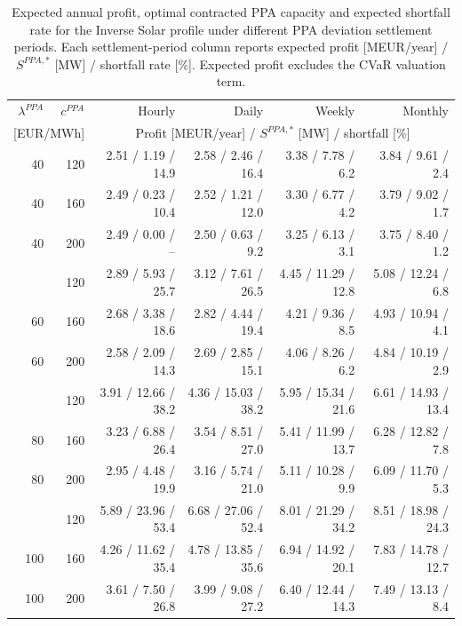 \begin{table}[htbp]
\centering
\scriptsize
\setlength{\tabcolsep}{2.5pt}
\caption{Expected annual profit, optimal contracted PPA capacity and expected shortfall rate for the Inverse Solar profile under different PPA deviation settlement periods. Each settlement-period column reports expected profit [MEUR/year] / $S^{PPA,*}$ [MW] / shortfall rate [\%]. Expected profit excludes the CVaR valuation term.}
\label{tab:settlement_period_inverse_solar}
\begin{tabular*}{\textwidth}{@{\extracolsep{\fill}}rrrrrr@{}}
\toprule
$\lambda^{PPA}$ & $c^{PPA}$ & Hourly & Daily & Weekly & Monthly \\
\multicolumn{2}{c}{[EUR/MWh]} & \multicolumn{4}{c}{Profit [MEUR/year] / $S^{PPA,*}$ [MW] / shortfall [\%]} \\
\midrule
40 & 120 & 2.51 / 1.19 / 14.9 & 2.58 / 2.46 / 16.4 & 3.38 / 7.78 / 6.2 & 3.84 / 9.61 / 2.4 \\
40 & 160 & 2.49 / 0.23 / 10.4 & 2.52 / 1.21 / 12.0 & 3.30 / 6.77 / 4.2 & 3.79 / 9.02 / 1.7 \\
40 & 200 & 2.49 / 0.00 / -- & 2.50 / 0.63 / 9.2 & 3.25 / 6.13 / 3.1 & 3.75 / 8.40 / 1.2 \\
\addlinespace
60 & 120 & 2.89 / 5.93 / 25.7 & 3.12 / 7.61 / 26.5 & 4.45 / 11.29 / 12.8 & 5.08 / 12.24 / 6.8 \\
60 & 160 & 2.68 / 3.38 / 18.6 & 2.82 / 4.44 / 19.4 & 4.21 / 9.36 / 8.5 & 4.93 / 10.94 / 4.1 \\
60 & 200 & 2.58 / 2.09 / 14.3 & 2.69 / 2.85 / 15.1 & 4.06 / 8.26 / 6.2 & 4.84 / 10.19 / 2.9 \\
\addlinespace
80 & 120 & 3.91 / 12.66 / 38.2 & 4.36 / 15.03 / 38.2 & 5.95 / 15.34 / 21.6 & 6.61 / 14.93 / 13.4 \\
80 & 160 & 3.23 / 6.88 / 26.4 & 3.54 / 8.51 / 27.0 & 5.41 / 11.99 / 13.7 & 6.28 / 12.82 / 7.8 \\
80 & 200 & 2.95 / 4.48 / 19.9 & 3.16 / 5.74 / 21.0 & 5.11 / 10.28 / 9.9 & 6.09 / 11.70 / 5.3 \\
\addlinespace
100 & 120 & 5.89 / 23.96 / 53.4 & 6.68 / 27.06 / 52.4 & 8.01 / 21.29 / 34.2 & 8.51 / 18.98 / 24.3 \\
100 & 160 & 4.26 / 11.62 / 35.4 & 4.78 / 13.85 / 35.6 & 6.94 / 14.92 / 20.1 & 7.83 / 14.78 / 12.7 \\
100 & 200 & 3.61 / 7.50 / 26.8 & 3.99 / 9.08 / 27.2 & 6.40 / 12.44 / 14.3 & 7.49 / 13.13 / 8.4 \\
\bottomrule
\end{tabular*}
\end{table}

